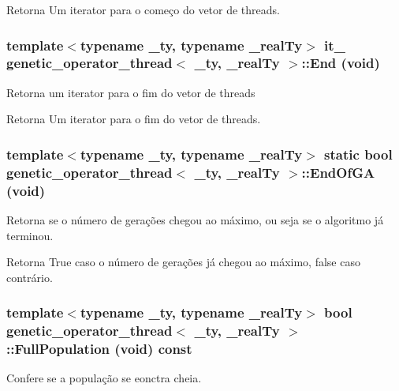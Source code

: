 \begin{DoxyReturn}{Retorna}
Um iterator para o começo do vetor de threads. 
\end{DoxyReturn}
\hypertarget{classgenetic__operator__thread_ae836d401cde0a8ac21025348b9fcedf6}{
\subsubsection[{End}]{\setlength{\rightskip}{0pt plus 5cm}template$<$typename \_\-ty, typename \_\-realTy$>$ {\bf it\_\-} {\bf genetic\_\-operator\_\-thread}$<$ \_\-ty, \_\-realTy $>$::End (void)}}
\label{classgenetic__operator__thread_ae836d401cde0a8ac21025348b9fcedf6}
Retorna um iterator para o fim do vetor de threads

\begin{DoxyReturn}{Retorna}
Um iterator para o fim do vetor de threads. 
\end{DoxyReturn}
\hypertarget{classgenetic__operator__thread_aad1cfa9857458b80ca2f5ba2fa3c5d74}{
\subsubsection[{EndOfGA}]{\setlength{\rightskip}{0pt plus 5cm}template$<$typename \_\-ty, typename \_\-realTy$>$ static bool {\bf genetic\_\-operator\_\-thread}$<$ \_\-ty, \_\-realTy $>$::EndOfGA (void)}}
\label{classgenetic__operator__thread_aad1cfa9857458b80ca2f5ba2fa3c5d74}
Retorna se o número de gerações chegou ao máximo, ou seja se o algoritmo já terminou.

\begin{DoxyReturn}{Retorna}
True caso o número de gerações já chegou ao máximo, false caso contrário. 
\end{DoxyReturn}
\hypertarget{classgenetic__operator__thread_a2fdf96fda297cef206de86300ab7df0c}{
\subsubsection[{FullPopulation}]{\setlength{\rightskip}{0pt plus 5cm}template$<$typename \_\-ty, typename \_\-realTy$>$ bool {\bf genetic\_\-operator\_\-thread}$<$ \_\-ty, \_\-realTy $>$::FullPopulation (void) const}}
\label{classgenetic__operator__thread_a2fdf96fda297cef206de86300ab7df0c}
Confere se a população se eonctra cheia.

